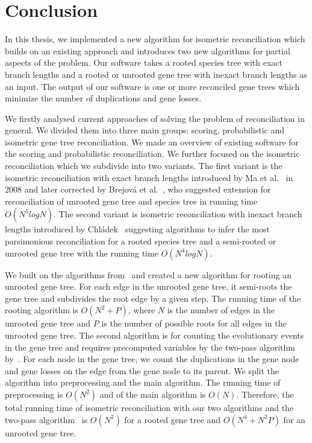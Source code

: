 \chapter*{Conclusion}

In this thesis, we implemented a new algorithm for isometric reconciliation which builds on an existing approach and introduces two new algorithms for partial aspects of the problem. Our software takes a rooted species tree with exact branch lengths and a rooted or unrooted gene tree with inexact branch lengths as an input. The output of our software is one or more reconciled gene trees which minimize the number of duplications and gene losses.

We firstly analysed current approaches of solving the problem of reconciliation in general. We divided them into three main groups: scoring, probabilistic and isometric gene tree reconciliation. We made an overview of existing software for the scoring and probabilistic reconciliation. We further focused on the isometric reconciliation which we subdivide into two variants. The first variant is the isometric reconciliation with exact branch lengths introduced by Ma et al.~\cite{ma} in 2008 and later corrected by Brejová et al.~\cite{brejova}, who suggested extension for reconciliation of unrooted gene tree and species tree in running time $O(N^5 log N)$. The second variant is isometric reconciliation with inexact branch lengths introduced by Chládek~\cite{chladek_thesis} suggesting algorithms to infer the most parsimonious reconciliation for a rooted species tree and a semi-rooted or unrooted gene tree with the running time $O(N^4 log N)$.

We built on the algorithms from~\cite{chladek_thesis} and created a new algorithm for rooting an unrooted gene tree. For each edge in the unrooted gene tree, it semi-roots the gene tree and subdivides the root edge by a given step. The running time of the rooting algorithm is $O(N^2 + P)$, where $N$ is the number of edges in the unrooted gene tree and $P$ is the number of possible roots for all edges in the unrooted gene tree. The second algorithm is for counting the evolutionary events in the gene tree and requires precomputed variables by the two-pass algorithm by~\cite{chladek_thesis}. For each node in the gene tree, we count the duplications in the gene node and gene losses on the edge from the gene node to its parent. We split the algorithm into preprocessing and the main algorithm. The running time of preprocessing is $O(N^2)$ and of the main algorithm is $O(N)$. Therefore, the total running time of isometric reconciliation with our two algorithms and the two-pass algorithm~\cite{chladek_thesis} is $O(N^2)$ for a rooted gene tree and $O(N^4 + N^2P)$ for an unrooted gene tree.

